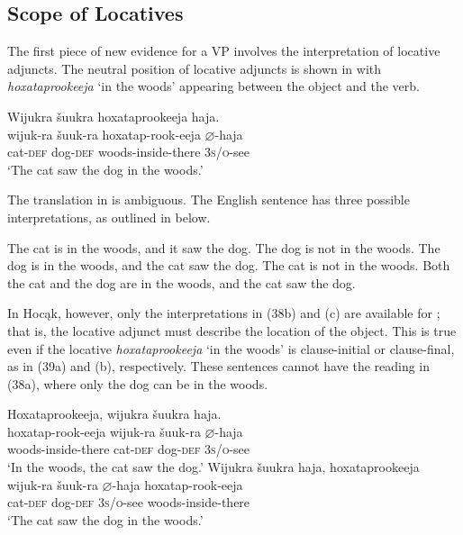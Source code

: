 \documentclass[output=paper]{LSP/langsci}
\begin{document}
\subsection{Scope of Locatives}

The first piece of new evidence for a VP involves the interpretation of locative adjuncts. The neutral position of locative adjuncts is shown in  with \textit{hoxataprookeeja} `in the woods' appearing between the object and the verb.

\begin{exe}
\ex 
\glll Wijukra	\v{s}uukra		hoxataprookeeja		haja.\\
wijuk-ra	\v{s}uuk-ra		hoxatap-rook-eeja		$\varnothing$-haja \\
cat-\textsc{def}		dog-\textsc{def} 	woods-inside-there	\textsc{3s/o}-see \\
\trans `The cat saw the dog in the woods.' 
\end{exe}

The translation in  is ambiguous. The English sentence has three possible interpretations, as outlined in  below.

\begin{exe}
\ex 
\begin{xlist}
\ex The cat is in the woods, and it saw the dog. The dog is not in the woods. 
\ex The dog is in the woods, and the cat saw the dog. The cat is not in the woods.
\ex Both the cat and the dog are in the woods, and the cat saw the dog.
\end{xlist}
\end{exe}

In Hocąk, however, only the interpretations in (38b) and (c) are available for ; that is, the locative adjunct must describe the location of the object. This is true even if the locative \textit{hoxataprookeeja} `in the woods' is clause-initial or clause-final, as in (39a) and (b), respectively. These sentences cannot have the reading in (38a), where only the dog can be in the woods.

\begin{exe}
\ex
\begin{xlist}
\ex 
\glll Hoxataprookeeja, 		wijukra	\v{s}uukra			haja.\\
hoxatap-rook-eeja		wijuk-ra	\v{s}uuk-ra		$\varnothing$-haja \\
	woods-inside-there 	cat-\textsc{def}		dog-\textsc{def}		\textsc{3s/o}-see \\
\trans `In the woods, the cat saw the dog.'
\ex 
\glll Wijukra	\v{s}uukra			haja,				hoxataprookeeja\\
wijuk-ra	\v{s}uuk-ra		$\varnothing$-haja			hoxatap-rook-eeja \\
	cat-\textsc{def}		dog-\textsc{def}		\textsc{3s/o}-see	woods-inside-there \\
\trans `The cat saw the dog in the woods.'
\end{xlist}
\end{exe}
	
\end{document}
